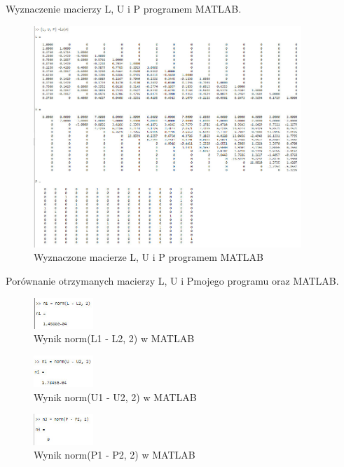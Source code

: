 \documentclass[9pt]{article}
\begin{document}
Wyznaczenie macierzy L, U i P programem MATLAB.

\begin{figure}[h]
  \centering
  \includegraphics[width=0.9\textwidth]{L_U_P_2.jpg}
  \caption{Wyznaczone macierze L, U i P programem MATLAB}
\end{figure}
\newpage

Porównanie otrzymanych macierzy L, U i Pmojego programu oraz MATLAB.

\begin{figure}[h]
  \centering
  \includegraphics[width=0.2\textwidth]{L1_L2_comparison_2.jpg}
  \caption{Wynik norm(L1 - L2, 2) w MATLAB}
\end{figure}

\begin{figure}[h]
  \centering
  \includegraphics[width=0.2\textwidth]{U1_U2_comparison_2.jpg}
  \caption{Wynik norm(U1 - U2, 2) w MATLAB}
\end{figure}

\begin{figure}[h]
  \centering
  \includegraphics[width=0.2\textwidth]{P1_P2_comparison_2.jpg}
  \caption{Wynik norm(P1 - P2, 2) w MATLAB}
\end{figure}
\end{document}
